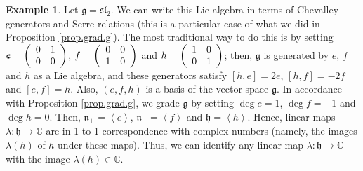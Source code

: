 \documentclass
[numbers=enddot,12pt,final,onecolumn,german,notitlepage]{scrartcl}%
\theoremstyle{definition}
\newtheorem{example}[theo]{Example}
\begin{document}
\begin{example}
\label{exa.sl2}Let $\mathfrak{g}=\mathfrak{sl}_{2}$. We can write this Lie
algebra in terms of Chevalley generators and Serre relations (this is a
particular case of what we did in Proposition \ref{prop.grad.g}). The most
traditional way to do this is by setting $e=\left(
\begin{array}
[c]{cc}%
0 & 1\\
0 & 0
\end{array}
\right)  $, $f=\left(
\begin{array}
[c]{cc}%
0 & 0\\
1 & 0
\end{array}
\right)  $ and $h=\left(
\begin{array}
[c]{cc}%
1 & 0\\
0 & 1
\end{array}
\right)  $; then, $\mathfrak{g}$ is generated by $e$, $f$ and $h$ as a Lie
algebra, and these generators satisfy $\left[  h,e\right]  =2e$, $\left[
h,f\right]  =-2f$ and $\left[  e,f\right]  =h$. Also, $\left(  e,f,h\right)  $
is a basis of the vector space $\mathfrak{g}$. In accordance with Proposition
\ref{prop.grad.g}, we grade $\mathfrak{g}$ by setting $\deg e=1$, $\deg f=-1$
and $\deg h=0$. Then, $\mathfrak{n}_{+}=\left\langle e\right\rangle $,
$\mathfrak{n}_{-}=\left\langle f\right\rangle $ and $\mathfrak{h}=\left\langle
h\right\rangle $. Hence, linear maps $\lambda:\mathfrak{h}\rightarrow
\mathbb{C}$ are in 1-to-1 correspondence with complex numbers (namely, the
images $\lambda\left(  h\right)  $ of $h$ under these maps). Thus, we can
identify any linear map $\lambda:\mathfrak{h}\rightarrow\mathbb{C}$ with the
image $\lambda\left(  h\right)  \in\mathbb{C}$.


\end{example}
\end{document}
